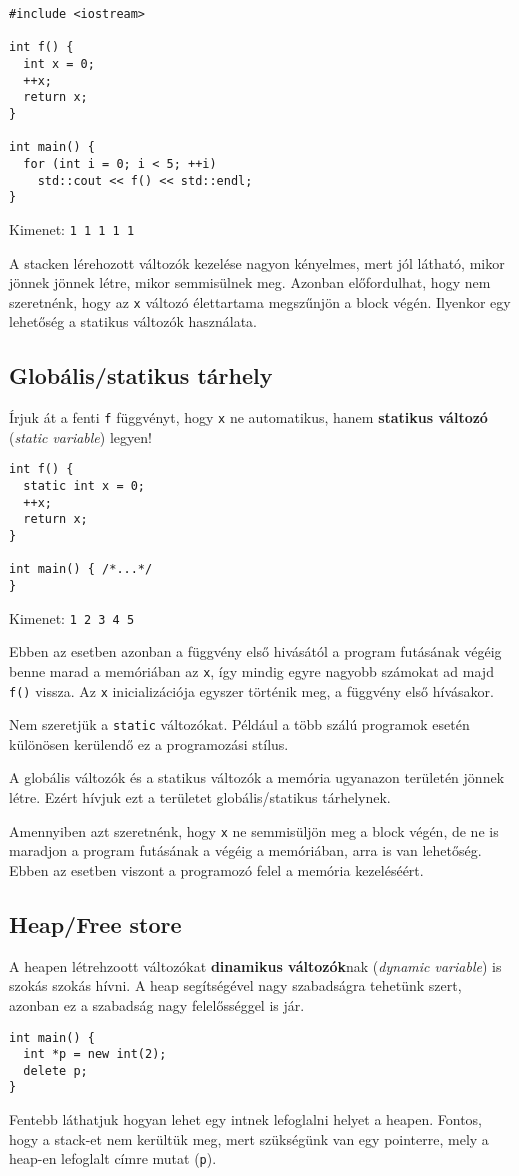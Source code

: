 \documentclass[../cpp_book/cpp_book.tex]{subfiles}
\begin{document}
	\begin{lstlisting}
#include <iostream>

int f() {
  int x = 0;
  ++x;
  return x;
}

int main() {
  for (int i = 0; i < 5; ++i)
    std::cout << f() << std::endl;
}
	\end{lstlisting}
	Kimenet: \texttt{1 1 1 1 1}
	\smallskip
	
  A stacken lérehozott változók kezelése nagyon kényelmes, mert jól látható, mikor jönnek jönnek létre, mikor semmisülnek meg. Azonban előfordulhat, hogy nem szeretnénk, hogy az \texttt{x} változó élettartama megszűnjön a block végén. Ilyenkor egy lehetőség a statikus változók használata.
	\subsection{Globális/statikus tárhely}
	Írjuk át a fenti \texttt{f} függvényt, hogy \texttt{x} ne automatikus, hanem \textbf{statikus változó} (\textit{static variable}) legyen!
	\begin{lstlisting}
int f() {
  static int x = 0;
  ++x;
  return x;
}

int main() { /*...*/
}
	\end{lstlisting}
	Kimenet: \texttt{1 2 3 4 5}
	
  Ebben az esetben azonban a függvény első hivásától a program futásának végéig benne marad a memóriában az \texttt{x}, így mindig egyre nagyobb számokat ad majd \texttt{f()} vissza. Az \texttt{x} inicializációja egyszer történik meg, a függvény első hívásakor. 
	\begin{note}
		Nem szeretjük a \texttt{static} változókat. Például a több szálú programok esetén különösen kerülendő ez a programozási stílus.
	\end{note}

  A globális változók és a statikus változók a memória ugyanazon területén jönnek létre. Ezért hívjuk ezt a területet globális/statikus tárhelynek.

  \medskip
	Amennyiben azt szeretnénk, hogy \texttt{x} ne semmisüljön meg a block végén, de ne is maradjon a program futásának a végéig a memóriában, arra is van lehetőség. Ebben az esetben viszont a programozó felel a memória kezeléséért.
	\subsection{Heap/Free store}
	A heapen létrehzoott változókat \textbf{dinamikus változók}nak (\textit{dynamic variable}) is szokás szokás hívni. A heap segítségével nagy szabadságra tehetünk szert, azonban ez a szabadság nagy felelősséggel is jár.
	\begin{lstlisting}
int main() {
  int *p = new int(2);
  delete p;
}
	\end{lstlisting}
	Fentebb láthatjuk hogyan lehet egy intnek lefoglalni helyet a heapen. Fontos, hogy a stack-et nem kerültük meg, mert szükségünk van egy pointerre, mely a heap-en lefoglalt címre mutat (\texttt{p}).
	
\end{document}
